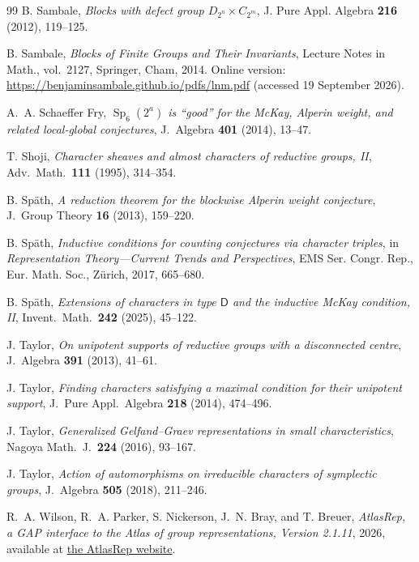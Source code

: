 \documentclass[10pt]{amsart}
\theoremstyle{definition}
\newcommand{\GAP}{\textsf{GAP}}
\numberwithin{equation}{section}
\numberwithin{table}{section}
\begin{document}
\begin{thebibliography}{99}
B. Sambale,
{\it Blocks with defect group $D_{2^n}\times C_{2^m}$},
J. Pure Appl. Algebra \textbf{216} (2012), 119--125.

B. Sambale,
{\it Blocks of Finite Groups and Their Invariants},
Lecture Notes in Math., vol.~2127, Springer, Cham, 2014.
Online version: \url{https://benjaminsambale.github.io/pdfs/lnm.pdf} (accessed 19 September 2026).

A.~A. Schaeffer Fry,
{\it $\operatorname{Sp}_6(2^a)$ is ``good'' for the McKay, Alperin weight,
and related local-global conjectures},
J.\ Algebra \textbf{401} (2014), 13--47.

T. Shoji,
{\it Character sheaves and almost characters of reductive groups, II},
Adv.\ Math.\ \textbf{111} (1995), 314--354.

B. Sp\"ath,
{\it A reduction theorem for the blockwise Alperin weight conjecture},
J.\ Group Theory \textbf{16} (2013), 159--220.

B. Sp\"ath,
{\it Inductive conditions for counting conjectures via character triples},
in {\it Representation Theory---Current Trends and Perspectives},
EMS Ser. Congr. Rep., Eur. Math. Soc., Z\"urich, 2017, 665--680.

B. Sp\"ath,
{\it Extensions of characters in type $\mathsf D$ and the inductive McKay
condition, II},
Invent.\ Math.\ \textbf{242} (2025), 45--122.

J. Taylor,
{\it On unipotent supports of reductive groups with a disconnected centre},
J.\ Algebra \textbf{391} (2013), 41--61.

J. Taylor,
{\it Finding characters satisfying a maximal condition for their
unipotent support},
J.\ Pure Appl.\ Algebra \textbf{218} (2014), 474--496.

J. Taylor,
{\it Generalized Gelfand--Graev representations in small characteristics},
Nagoya Math.\ J.\ \textbf{224} (2016), 93--167.

J. Taylor,
{\it Action of automorphisms on irreducible characters of symplectic
groups},
J.\ Algebra \textbf{505} (2018), 211--246.

\enlargethispage{3\baselineskip}
\enlargethispage{2\baselineskip}
R.~A. Wilson, R.~A. Parker, S. Nickerson, J.~N. Bray, and T. Breuer,
{\it AtlasRep, a \textup{\GAP} interface to the Atlas of group
representations, Version 2.1.11},
2026, available at
\href{https://www.math.rwth-aachen.de/~Thomas.Breuer/atlasrep}
{the AtlasRep website}.

\end{thebibliography}
\end{document}
